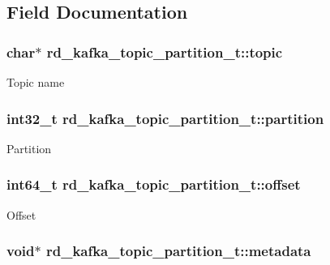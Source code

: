 \subsection{Field Documentation}
\hypertarget{structrd__kafka__topic__partition__t_a981a6411337ecf5d95e6ab48d1071177}{
\subsubsection[{topic}]{\setlength{\rightskip}{0pt plus 5cm}char$\ast$ {\bf rd\_\-kafka\_\-topic\_\-partition\_\-t::topic}}}
\label{structrd__kafka__topic__partition__t_a981a6411337ecf5d95e6ab48d1071177}
Topic name \hypertarget{structrd__kafka__topic__partition__t_aa37d08c9e5f4612f5a962405c65ae2c1}{
\subsubsection[{partition}]{\setlength{\rightskip}{0pt plus 5cm}int32\_\-t {\bf rd\_\-kafka\_\-topic\_\-partition\_\-t::partition}}}
\label{structrd__kafka__topic__partition__t_aa37d08c9e5f4612f5a962405c65ae2c1}
Partition \hypertarget{structrd__kafka__topic__partition__t_a60c27c6a2f759b7fdfd382b93c12cd3c}{
\subsubsection[{offset}]{\setlength{\rightskip}{0pt plus 5cm}int64\_\-t {\bf rd\_\-kafka\_\-topic\_\-partition\_\-t::offset}}}
\label{structrd__kafka__topic__partition__t_a60c27c6a2f759b7fdfd382b93c12cd3c}
Offset \hypertarget{structrd__kafka__topic__partition__t_aa2a3d40daa1b0158186f3584886da5dc}{
\subsubsection[{metadata}]{\setlength{\rightskip}{0pt plus 5cm}void$\ast$ {\bf rd\_\-kafka\_\-topic\_\-partition\_\-t::metadata}}}
